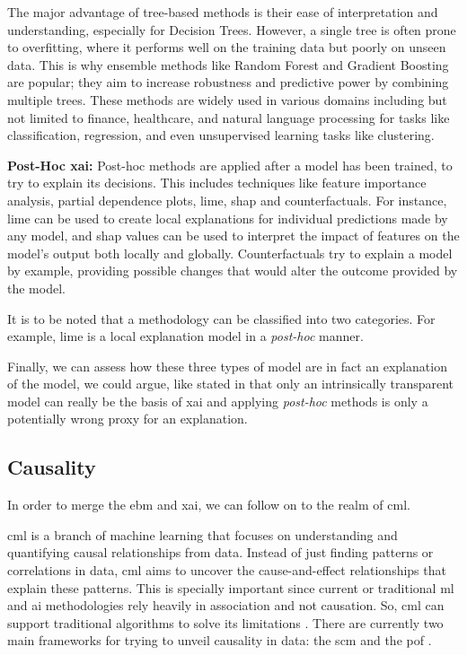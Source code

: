 The major advantage of tree-based methods is their ease of interpretation and understanding, especially for Decision Trees. However, a single tree is often prone to overfitting, where it performs well on the training data but poorly on unseen data. This is why ensemble methods like Random Forest and Gradient Boosting are popular; they aim to increase robustness and predictive power by combining multiple trees. These methods are widely used in various domains including but not limited to finance, healthcare, and natural language processing for tasks like classification, regression, and even unsupervised learning tasks like clustering.

\textbf{Post-Hoc \ac{xai}:} Post-hoc methods are applied after a model has been trained, to try to explain its decisions. This includes techniques like feature importance analysis, partial dependence plots, \ac{lime}, \ac{shap} and counterfactuals. For instance, \ac{lime} can be used to create local explanations for individual predictions made by any model, and \ac{shap} values can be used to interpret the impact of features on the model's output both locally and globally. Counterfactuals try to explain a model by example, providing possible changes that would alter the outcome provided by the model.

It is to be noted that a methodology can be classified into two categories. For example, \ac{lime} is a local explanation model in a \textit{post-hoc} manner.

Finally, we can assess how these three types of model are in fact an explanation of the model, we could argue, like stated in \cite{rudinStopExplainingBlack2019} that only an intrinsically transparent model can really be the basis of \ac{xai} and applying \textit{post-hoc} methods is only a potentially wrong proxy for an explanation.

\subsection{Causality}

In order to merge the \ac{ebm} and \ac{xai}, we can follow on to the realm of \ac{cml}.


\ac{cml} is a branch of machine learning that focuses on understanding and quantifying causal relationships from data. Instead of just finding patterns or correlations in data, \ac{cml} aims to uncover the cause-and-effect relationships that explain these patterns.
This is specially important since current or traditional \ac{ml} and \ac{ai} methodologies rely heavily in association and not causation. So, \ac{cml} can support traditional algorithms to solve its limitations \cite{pearlTheoreticalImpedimentsMachine2018}.
There are currently two main frameworks for trying to unveil causality in data: the \ac{scm}  and the \ac{pof} \cite{shiLearningCausalEffects2022b}.

